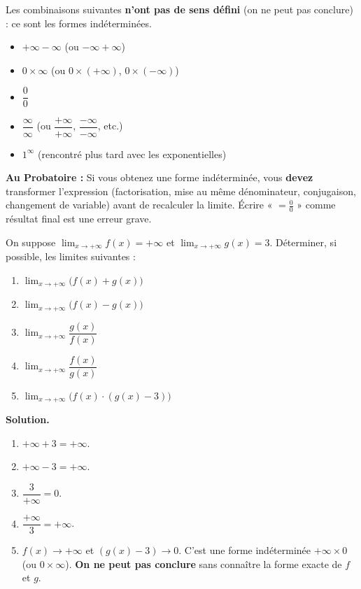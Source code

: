 \documentclass[11pt]{article}
\newcommand{\cle}[1]{{\popxbold\color{popdark}#1}}
\begin{document}
\begin{attention}
Les combinaisons suivantes \textbf{n'ont pas de sens défini} (on ne peut pas conclure) : ce sont les \cle{formes indéterminées}.
\begin{itemize}
\item $+\infty - \infty$ (ou $-\infty + \infty$)
\item $0 \times \infty$ (ou $0 \times (+\infty)$, $0 \times (-\infty)$)
\item $\dfrac{0}{0}$
\item $\dfrac{\infty}{\infty}$ (ou $\dfrac{+\infty}{+\infty}$, $\dfrac{-\infty}{-\infty}$, etc.)
\item $1^{\infty}$ (rencontré plus tard avec les exponentielles)
\end{itemize}
\textbf{Au Probatoire :} Si vous obtenez une forme indéterminée, vous \textbf{devez} transformer l'expression (factorisation, mise au même dénominateur, conjugaison, changement de variable) avant de recalculer la limite. Écrire « $= \frac{0}{0} $ » comme résultat final est une erreur grave.
\end{attention}

\begin{exoresolu}
On suppose $\displaystyle\lim_{x \to +\infty} f(x) = +\infty$ et $\displaystyle\lim_{x \to +\infty} g(x) = 3$.
Déterminer, si possible, les limites suivantes :
\begin{enumerate}
\item $\displaystyle\lim_{x \to +\infty} \bigl(f(x) + g(x)\bigr)$
\item $\displaystyle\lim_{x \to +\infty} \bigl(f(x) - g(x)\bigr)$
\item $\displaystyle\lim_{x \to +\infty} \dfrac{g(x)}{f(x)}$
\item $\displaystyle\lim_{x \to +\infty} \dfrac{f(x)}{g(x)}$
\item $\displaystyle\lim_{x \to +\infty} \bigl(f(x) \cdot (g(x) - 3)\bigr)$
\end{enumerate}
\tcblower
\textbf{Solution.}
\begin{enumerate}
\item $+\infty + 3 = +\infty$.
\item $+\infty - 3 = +\infty$.
\item $\dfrac{3}{+\infty} = 0$.
\item $\dfrac{+\infty}{3} = +\infty$.
\item $f(x) \to +\infty$ et $(g(x)-3) \to 0$. C'est une forme indéterminée $+\infty \times 0$ (ou $0 \times \infty$). \textbf{On ne peut pas conclure} sans connaître la forme exacte de $f$ et $g$.
\end{enumerate}
\end{exoresolu}
\end{document}
